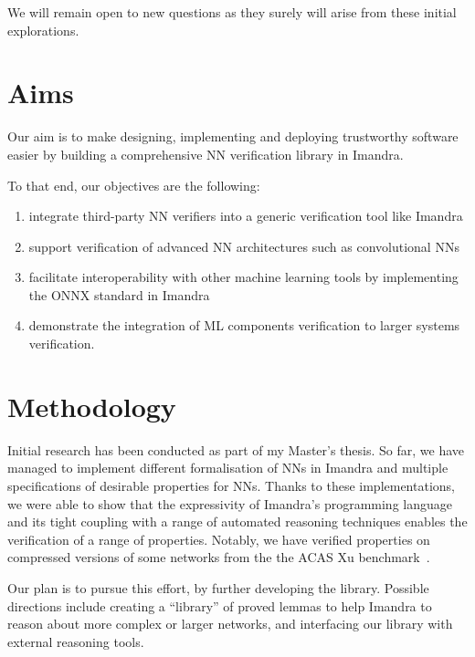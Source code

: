 \documentclass[]{article}
\begin{document}
We will remain open to new questions as they surely will arise from these initial explorations.


\section{Aims}


Our aim is to make designing, implementing and deploying trustworthy software easier by building a comprehensive NN verification library in Imandra.

To that end, our objectives are the following:
\begin{enumerate}
\item integrate third-party NN verifiers into a generic verification tool like Imandra
\item support verification of advanced NN architectures such as convolutional NNs
\item facilitate interoperability with other machine learning tools by implementing the ONNX standard in Imandra
\item demonstrate the integration of ML components verification to larger systems verification.
\end{enumerate}

\section{Methodology}

Initial research has been conducted as part of my Master's thesis. So far, we have managed to implement different formalisation of NNs in Imandra and multiple specifications of desirable properties for NNs. Thanks to these implementations, we were able to show that the expressivity of Imandra's programming language and its tight coupling with a range of automated reasoning techniques enables the verification of a range of properties. Notably, we have verified properties on compressed versions of some networks from the the ACAS Xu benchmark~\cite{katz_reluplex_2017}.

Our plan is to pursue this effort, by further developing the library. Possible directions include creating a ``library'' of proved lemmas to help Imandra to reason about more complex or larger networks, and interfacing our library with external reasoning tools.
\end{document}
